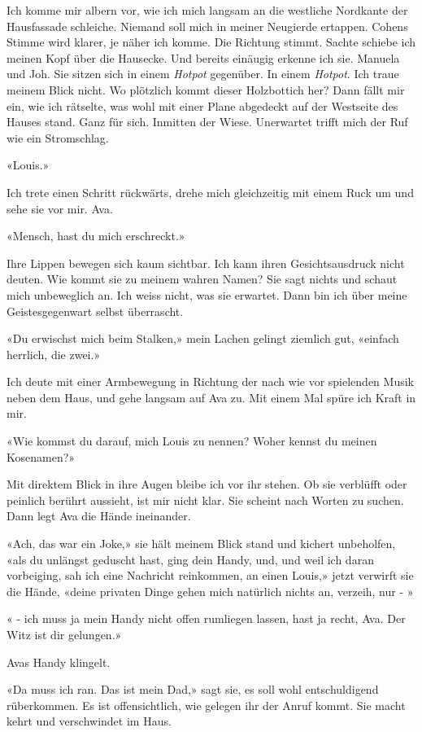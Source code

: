 Ich komme mir albern vor, wie ich mich langsam an die westliche
Nordkante der Hausfassade schleiche. Niemand soll mich in meiner
Neugierde ertappen. Cohens Stimme wird klarer, je näher ich komme. Die
Richtung stimmt. Sachte schiebe ich meinen Kopf über die Hausecke. Und
bereits einäugig erkenne ich sie. Manuela und Joh. Sie sitzen sich in
einem \emph{Hotpot} gegenüber. In einem \emph{Hotpot}. Ich traue meinem
Blick nicht. Wo plötzlich kommt dieser Holzbottich her? Dann fällt mir
ein, wie ich rätselte, was wohl mit einer Plane abgedeckt auf der
Westseite des Hauses stand. Ganz für sich. Inmitten der Wiese.
Unerwartet trifft mich der Ruf wie ein Stromschlag.

«Louis.»

Ich trete einen Schritt rückwärts, drehe mich gleichzeitig mit einem
Ruck um und sehe sie vor mir. Ava.

«Mensch, hast du mich erschreckt.»

Ihre Lippen bewegen sich kaum sichtbar. Ich kann ihren Gesichtsausdruck
nicht deuten. Wie kommt sie zu meinem wahren Namen? Sie sagt nichts und
schaut mich unbeweglich an. Ich weiss nicht, was sie erwartet.
Dann bin ich über meine Geistesgegenwart selbst überrascht.

«Du erwischst mich beim Stalken,» mein Lachen gelingt ziemlich gut,
«einfach herrlich, die zwei.»

Ich deute mit einer Armbewegung in Richtung der nach wie vor spielenden
Musik neben dem Haus, und gehe langsam auf Ava zu. Mit einem Mal spüre
ich Kraft in mir.

«Wie kommst du darauf, mich Louis zu nennen? Woher kennst du meinen
Kosenamen?»

Mit direktem Blick in ihre Augen bleibe ich vor ihr stehen.
Ob sie verblüfft oder peinlich berührt aussieht, ist mir nicht klar. Sie scheint nach Worten zu suchen. Dann legt Ava die Hände
ineinander.

«Ach, das war ein Joke,» sie hält meinem Blick stand und kichert
unbeholfen, «als du unlängst geduscht hast, ging dein Handy, und, und
weil ich daran vorbeiging, sah ich eine Nachricht reinkommen, an einen
Louis,» jetzt verwirft sie die Hände, «deine privaten Dinge gehen mich
natürlich nichts an, verzeih, nur - »

« - ich muss ja mein Handy nicht offen rumliegen lassen, hast ja recht,
Ava. Der Witz ist dir gelungen.»

Avas Handy klingelt.

«Da muss ich ran. Das ist mein Dad,» sagt sie, es soll wohl
entschuldigend rüberkommen.
Es ist offensichtlich, wie gelegen ihr der Anruf kommt. Sie macht kehrt
und verschwindet im Haus.

